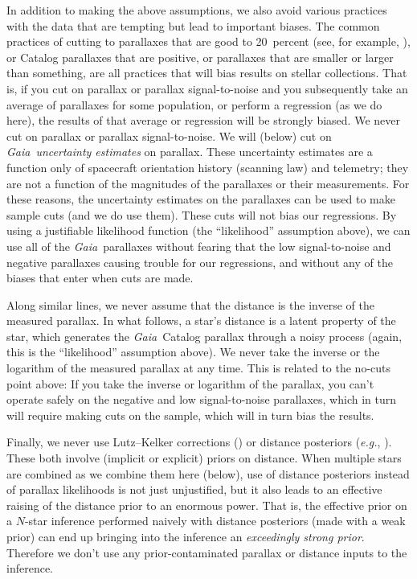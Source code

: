 \documentclass[modern]{aastex62}
\newcommand{\foreign}[1]{\textsl{#1}}
\newcommand{\eg}{\foreign{e.g.}}
\newcommand{\project}[1]{\textsl{#1}}
\newcommand{\gaia}{\project{Gaia}}
\begin{document}
In addition to making the above assumptions, we also avoid various practices
with the data that are tempting but lead to important biases.
The common practices of cutting to parallaxes that are good to 20~percent
(see, for example, \citealt{trick, helmi}),
or Catalog parallaxes that are positive, or parallaxes that are smaller or
larger than something, are all practices that will bias results on stellar
collections.
That is, if you cut on parallax or parallax signal-to-noise and you subsequently
take an average of parallaxes for some population, or perform a regression (as we
do here), the results of that average or regression will be strongly biased.
We never cut on parallax or parallax signal-to-noise.
We will (below) cut on \gaia\ \emph{uncertainty estimates} on parallax.
These uncertainty estimates are a function only of spacecraft orientation history
(scanning law) and telemetry; they are not a function of the magnitudes of the
parallaxes or their measurements.
For these reasons, the uncertainty estimates on the parallaxes can be used to
make sample cuts (and we do use them).
These cuts will not bias our regressions.
By using a justifiable likelihood function (the ``likelihood'' assumption above),
we can use all of the \gaia\ parallaxes without fearing that the low signal-to-noise and
negative parallaxes causing trouble for our regressions, and without any of the biases
that enter when cuts are made.

Along similar lines, we never assume that the distance is the inverse of the
measured parallax.
In what follows, a star's distance is a latent property of the star, which generates
the \gaia\ Catalog parallax through a noisy process (again, this is
the ``likelihood'' assumption above).
We never take the inverse or the logarithm of the measured parallax at any time.
This is related to the no-cuts point above:
If you take the inverse or logarithm of the parallax, you can't operate safely
on the negative and low signal-to-noise parallaxes, which in turn will require
making cuts on the sample, which will in turn bias the results.

Finally, we never use Lutz--Kelker corrections (\citealt{lk}) or distance
posteriors (\eg, \citealt{calj}). These both involve (implicit or explicit) priors on 
distance.
When multiple stars are combined as we combine them here (below),
use of distance posteriors instead of parallax likelihoods is not just
unjustified, but it also leads to an
effective raising of the distance prior to an enormous power.
That is, the effective prior on a $N$-star inference performed naively
with distance posteriors (made with a weak prior) can end up
bringing into the inference an \emph{exceedingly
strong prior}.
Therefore we don't use any prior-contaminated parallax or distance
inputs to the inference.
\end{document}
